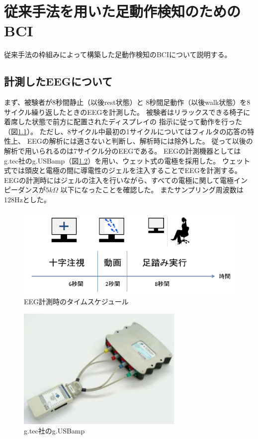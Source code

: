 \chapter{\mc 従来手法を用いた足動作検知のための\rm BCI}
従来手法の枠組みによって構築した足動作検知のBCIについて説明する。
\section{\mc 計測した\rm EEG\mc について}
まず、被験者が8秒間静止（以後rest状態）と
8秒間足動作（以後walk状態）を8サイクル繰り返したときのEEGを計測した。
被験者はリラックスできる椅子に着席した状態で前方に配置されたディスプレイの
指示に従って動作を行った（図\ref{fig:asibumi}）。
ただし、8サイクル中最初の1サイクルについてはフィルタの応答の特性上、
EEGの解析には適さないと判断し、解析時には除外した。
従って以後の解析で用いられるのは7サイクル分のEEGである。
EEGの計測機器としてはg.tec社のg.USBamp（図\ref{fig:usbamp}）を用い、ウェット式の電極を採用した。
ウェット式では頭皮と電極の間に導電性のジェルを注入することでEEGを計測する。
EEGの計測時にはジェルの注入を行いながら、すべての電極に関して電極インピーダンスが\(5k\Omega\)
以下になったことを確認した。
またサンプリング周波数は128Hzとした。
\begin{figure}
    \centering
    \includegraphics[width=13cm]{images/asibumi.png}
    \caption{EEG計測時のタイムスケジュール}
    \label{fig:asibumi}
\end{figure}
\begin{figure}
    \centering
    \includegraphics[width=8cm]{images/usbamp.png}
    \caption{g.tec社のg.USBamp}
    \label{fig:usbamp}
\end{figure}

